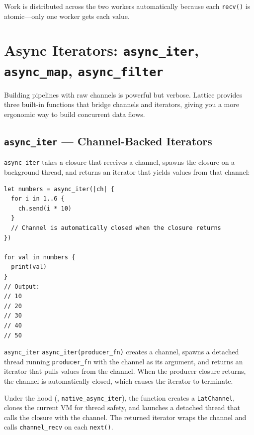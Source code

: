 Work is distributed across the two workers automatically because each \lstinline|recv()| is atomic---only one worker gets each value.

\section{Async Iterators: \texttt{async\_iter}, \texttt{async\_map}, \texttt{async\_filter}}\label{sec:async-iterators}


Building pipelines with raw channels is powerful but verbose.
Lattice provides three built-in functions that bridge channels and iterators, giving you a more ergonomic way to build concurrent data flows.

\subsection{\texttt{async\_iter} --- Channel-Backed Iterators}

\lstinline|async_iter| takes a closure that receives a channel, spawns the closure on a background thread, and returns an iterator that yields values from that channel:

\begin{lstlisting}[language=Lattice, caption={Creating an async iterator}]
let numbers = async_iter(|ch| {
  for i in 1..6 {
    ch.send(i * 10)
  }
  // Channel is automatically closed when the closure returns
})

for val in numbers {
  print(val)
}
// Output:
// 10
// 20
// 30
// 40
// 50
\end{lstlisting}

\begin{defnbox}{\texttt{async\_iter}}
\lstinline|async_iter(producer_fn)| creates a channel, spawns a detached thread running \lstinline|producer_fn| with the channel as its argument, and returns an iterator that pulls values from the channel.
When the producer closure returns, the channel is automatically closed, which causes the iterator to terminate.
\end{defnbox}

Under the hood (, \texttt{native\_async\_iter}), the function creates a \texttt{LatChannel}, clones the current VM for thread safety, and launches a detached thread that calls the closure with the channel.
The returned iterator wraps the channel and calls \texttt{channel\_recv} on each \texttt{next()}.

